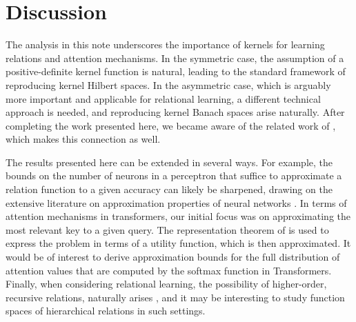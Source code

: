 \section{Discussion}

The analysis in this note underscores the importance of kernels for learning relations and attention mechanisms. In the symmetric case, the assumption of a positive-definite kernel function is natural, leading to the standard framework of reproducing kernel Hilbert spaces. In the asymmetric case, which is arguably more important and applicable for relational learning, a different technical approach is needed, and reproducing kernel Banach spaces arise naturally. After completing the work presented here, we became aware of the related work of \citet{wright2021transformers}, which makes this connection as well.

The results presented here can be extended in several ways. For example, the bounds on the 
number of neurons in a perceptron that suffice to approximate a relation function to a given accuracy can likely be sharpened, drawing on the extensive literature on approximation properties of neural networks \citep[e.g.,][]{petrushev1998approximation,pinkus1999approximation,makovoz1998uniform,burger2001error,maiorov2006approximation,bachBreakingCurseDimensionality2016}. In terms of attention mechanisms in transformers, our initial focus was on approximating the most relevant key to a given query. The representation theorem of \citet{debreuRepresentationPreferenceOrdering1954} is used to express the problem in terms of a utility function, which is then approximated. It would be of interest to derive approximation bounds for the full distribution of attention values that are computed by the softmax function in Transformers. Finally, when considering relational learning, the possibility of higher-order, recursive relations, naturally arises \citep[e.g.,][]{altabaaRelationalConvolutionalNetworks2023}, and it may be interesting to study function spaces of hierarchical relations in such settings.
